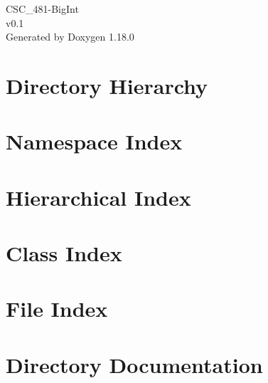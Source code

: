 \documentclass[twoside]{book}
\newcommand{\+}{\discretionary{\mbox{\scriptsize$\hookleftarrow$}}{}{}}
\newcommand{\clearemptydoublepage}{%
    \newpage{\pagestyle{empty}\cleardoublepage}%
  }
\begin{document}
  \raggedbottom
    \hypersetup{pageanchor=false,
                bookmarksnumbered=true,
                pdfencoding=unicode
               }
  \begin{titlepage}
  \vspace*{7cm}
  \begin{center}%
  {\Large CSC\+\_\+481-\/\+Big\+Int}\\
  [1ex]\large v0.\+1 \\
  \vspace*{1cm}
  {\large Generated by Doxygen 1.18.0}\\
  \end{center}
  \end{titlepage}
  \clearemptydoublepage
  \tableofcontents
  \clearemptydoublepage
  \hypersetup{pageanchor=true}




\chapter{Directory Hierarchy}

\chapter{Namespace Index}

\chapter{Hierarchical Index}

\chapter{Class Index}

\chapter{File Index}

\chapter{Directory Documentation}













\end{document}
